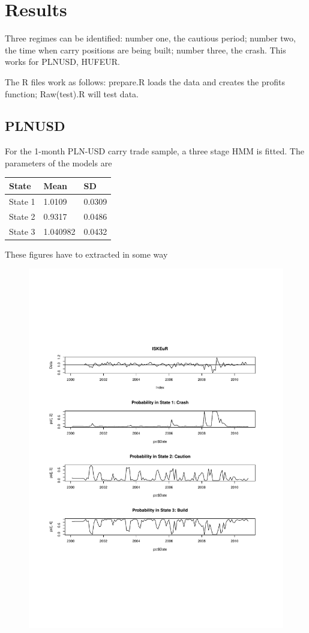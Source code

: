 \documentclass[12pt, a4paper, oneside]{article} %
\begin{document}
\section{Results}
Three regimes can be identified: number one, the cautious period; number two, the time when carry positions are being built; number three, the crash.  This works for PLNUSD, HUFEUR. 

The R files work as follows: prepare.R loads the data and creates the profits function; Raw(test).R will test data. 

\subsection{PLNUSD}
For the 1-month PLN-USD carry trade sample, a three stage HMM is fitted.  The parameters of the models are 

\begin{tabular}{l | l l}
State & Mean & SD \\
\hline
State 1 & 1.0109 & 0.0309\\
State 2 & 0.9317 & 0.0486\\
State 3 & 1.040982 & 0.0432\\
\end{tabular}

These figures have to extracted in some way 

 
\begin{figure}
\centering
\includegraphics[scale = .80]{ISKEUR.pdf}
\end{figure}
\end{document}
